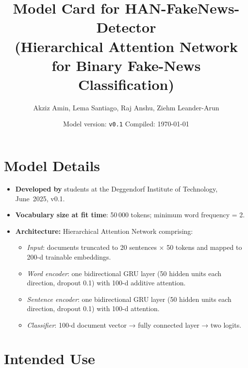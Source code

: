 \documentclass[11pt]{article}
\title{Model Card for \textbf{HAN-FakeNews-Detector} \\[2pt]

\large (Hierarchical Attention Network for Binary Fake-News Classification)}
\author{Akziz Amin, Lema Santiago, Raj Anshu, Ziehm Leander-Arun}
\date{Model version: \texttt{v0.1} \quad Compiled: \today}
\begin{document}
\maketitle

  


\section{Model Details}

\begin{itemize}[leftmargin=*, label=--]

\item \textbf{Developed by} students at the Deggendorf Institute of Technology, June~2025, v0.1.

\item \textbf{Vocabulary size at fit time}: 50\,000 tokens; minimum word frequency = 2.

\item \textbf{Architecture:} Hierarchical Attention Network comprising:

\begin{itemize}[noitemsep,topsep=0pt]

\item \emph{Input}: documents truncated to 20 sentences × 50 tokens and mapped to 200-d trainable embeddings.

\item \emph{Word encoder}: one bidirectional GRU layer (50 hidden units each direction, dropout 0.1) with 100-d additive attention.

\item \emph{Sentence encoder}: one bidirectional GRU layer (50 hidden units each direction, dropout 0.1) with 100-d attention.

\item \emph{Classifier}: 100-d document vector → fully connected layer → two logits.

\end{itemize}

\end{itemize}

  


\section{Intended Use}
\end{document}
